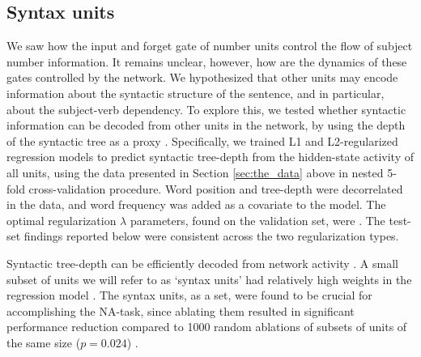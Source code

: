 \subsection{Syntax units}
\label{sec:syntax-units}
We saw how the input and forget gate of number units control the flow
of subject number information. It remains unclear, however, how are
the dynamics of these gates controlled by the network. We hypothesized
that other units may encode information about the syntactic structure
of the sentence, and in particular, about the subject-verb
dependency. To explore this, we tested whether syntactic information
can be decoded from other units in the network, by using the depth of
the syntactic tree as a proxy \cite{Nelson:etal:2017}. Specifically,
we trained L1 and L2-regularized regression models to predict
syntactic tree-depth from the hidden-state activity of all units,
using the data presented in Section \ref{sec:the_data} above in nested
5-fold cross-validation procedure.  Word position and tree-depth were
decorrelated in the data, and word frequency was added as a covariate
to the model. The optimal regularization $\lambda$ parameters, found
on the validation set, were . The test-set
findings reported below were consistent across the two regularization
types. 

Syntactic tree-depth can be efficiently decoded from network activity
. A small subset of units we will refer to
as `syntax units' had relatively high weights in the regression model
. The syntax
units, as a set, were found to be crucial for accomplishing the NA-task, since
ablating them resulted in significant performance reduction compared
to 1000 random ablations of subsets of units of the same size
($p=0.024$) . 


